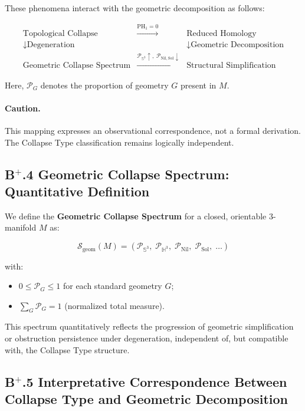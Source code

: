 \documentclass[11pt]{article}
\begin{document}
These phenomena interact with the geometric decomposition as follows:

\[
\begin{array}{ccc}
\text{Topological Collapse} & \xrightarrow{\mathrm{PH}_1 = 0} & \text{Reduced Homology} \\
\downarrow \text{Degeneration} & & \downarrow \text{Geometric Decomposition} \\
\text{Geometric Collapse Spectrum} & \xrightarrow{\mathcal{P}_{\mathbb{S}^3} \uparrow,\;\mathcal{P}_{\mathrm{Nil},\mathrm{Sol}} \downarrow} & \text{Structural Simplification}
\end{array}
\]

Here, $\mathcal{P}_G$ denotes the proportion of geometry $G$ present in $M$.

\paragraph{Caution.} This mapping expresses an observational correspondence, not a formal derivation. The Collapse Type classification remains logically independent.

\subsection*{B$^{+}$.4 Geometric Collapse Spectrum: Quantitative Definition}

We define the \textbf{Geometric Collapse Spectrum} for a closed, orientable $3$-manifold $M$ as:

\[
\mathcal{S}_{\mathrm{geom}}(M) = \left( \mathcal{P}_{\mathbb{S}^3},\; \mathcal{P}_{\mathbb{H}^3},\; \mathcal{P}_{\mathrm{Nil}},\; \mathcal{P}_{\mathrm{Sol}},\; \ldots \right)
\]

with:

\begin{itemize}
    \item $0 \leq \mathcal{P}_G \leq 1$ for each standard geometry $G$;
    \item $\sum_G \mathcal{P}_G = 1$ (normalized total measure).
\end{itemize}

This spectrum quantitatively reflects the progression of geometric simplification or obstruction persistence under degeneration, independent of, but compatible with, the Collapse Type structure.

\subsection*{B$^{+}$.5 Interpretative Correspondence Between Collapse Type and Geometric Decomposition}
\end{document}
